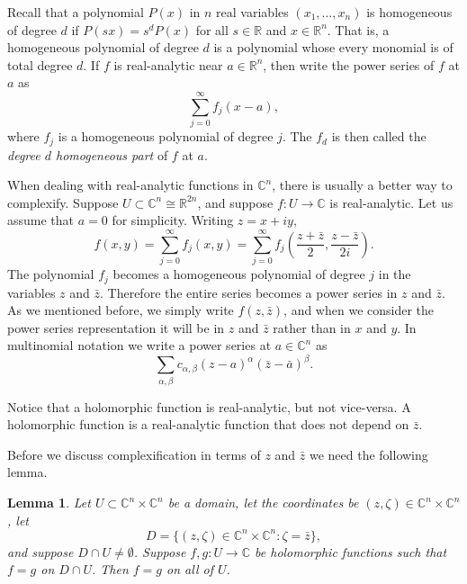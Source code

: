 \documentclass[12pt,openany]{book}
\newcommand{\C}{{\mathbb{C}}}
\newcommand{\R}{{\mathbb{R}}}
\newcommand{\myindex}[1]{#1\index{#1}}
\theoremstyle{plain}
\newtheorem{lemma}[thm]{Lemma}
\theoremstyle{remark}
\theoremstyle{definition}
\theoremstyle{exercise}
\theoremstyle{example}
\begin{document}
Recall that a polynomial $P(x)$ in $n$ real variables $(x_1,\ldots,x_n)$ is homogeneous of degree $d$ if
$P(s x) = s^d P(x)$ for all $s \in \R$ and $x \in \R^n$.
That is, a homogeneous polynomial of degree $d$ is a polynomial whose
every monomial
is of total degree $d$.
If $f$ is real-analytic near $a \in \R^n$, then
write the power series of $f$ at $a$ as
\begin{equation*}
\sum_{j=0}^{\infty} f_j(x-a) ,
\end{equation*}
where $f_j$ is a homogeneous polynomial of degree $j$.  The $f_d$ is then
called the
\emph{\myindex{degree $d$ homogeneous part}} of $f$
at $a$.

When dealing with real-analytic functions in $\C^n$, there is usually a better
way to complexify.
Suppose $U \subset \C^n \cong \R^{2n}$, and suppose $f \colon U \to
\C$ is real-analytic.  Let us assume that $a=0$ for simplicity.
Writing $z = x+iy$,
\begin{equation*}
f(x,y)
= 
\sum_{j=0}^\infty
f_j(x,y)
= 
\sum_{j=0}^\infty
f_j\left(
\frac{z+\bar{z}}{2},
\frac{z-\bar{z}}{2i}\right) .
\end{equation*}
The polynomial $f_j$ becomes a homogeneous polynomial of degree $j$
in the variables $z$ and $\bar{z}$.  Therefore the entire
series becomes a power series in $z$ and $\bar{z}$.  As we mentioned before,
we simply write $f(z,\bar{z})$, and when we consider the
power series representation it will be in $z$ and $\bar{z}$ rather than
in $x$ and $y$.
In multinomial notation we write a power series at $a \in \C^n$ as
\begin{equation*}
\sum_{\alpha,\beta} c_{\alpha,\beta} {(z-a)}^\alpha
{(\bar{z}-\bar{a})}^\beta .
\end{equation*}

Notice that a holomorphic function
is real-analytic, but not vice-versa.  A holomorphic function
is a real-analytic function that does not depend on $\bar{z}$.

Before we discuss complexification in terms of $z$ and $\bar{z}$ we need
the following lemma.

\begin{lemma}
Let $U \subset \C^n \times \C^n$ be a domain, let the coordinates be $(z,\zeta) \in \C^n \times
\C^n$, let
\begin{equation*}
D = \{ (z,\zeta) \in \C^n \times \C^n : \zeta = \bar{z} \},
\end{equation*}
and suppose $D \cap U \not= \emptyset$.
Suppose $f,g \colon U \to \C$ be holomorphic functions such that
$f=g$ on $D \cap U$.  Then $f=g$ on all of $U$.
\end{lemma}
\end{document}

